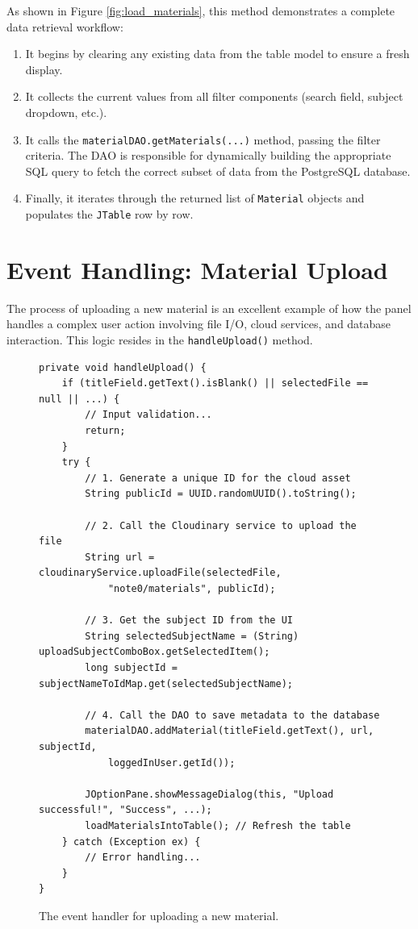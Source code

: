\documentclass[12pt, a4paper]{report}
\begin{document}
As shown in Figure \ref{fig:load_materials}, this method demonstrates a complete data retrieval workflow:
\begin{enumerate}
    \item It begins by clearing any existing data from the table model to ensure a fresh display.
    \item It collects the current values from all filter components (search field, subject dropdown, etc.).
    \item It calls the \texttt{materialDAO.getMaterials(...)} method, passing the filter criteria. The DAO is responsible for dynamically building the appropriate SQL query to fetch the correct subset of data from the PostgreSQL database.
    \item Finally, it iterates through the returned list of \texttt{Material} objects and populates the \texttt{JTable} row by row.
\end{enumerate}

\section{Event Handling: Material Upload}
The process of uploading a new material is an excellent example of how the panel handles a complex user action involving file I/O, cloud services, and database interaction. This logic resides in the \texttt{handleUpload()} method.

\begin{figure}[h!]
\begin{verbatim}
private void handleUpload() {
    if (titleField.getText().isBlank() || selectedFile == null || ...) {
        // Input validation...
        return;
    }
    try {
        // 1. Generate a unique ID for the cloud asset
        String publicId = UUID.randomUUID().toString();

        // 2. Call the Cloudinary service to upload the file
        String url = cloudinaryService.uploadFile(selectedFile, 
            "note0/materials", publicId);
        
        // 3. Get the subject ID from the UI
        String selectedSubjectName = (String) uploadSubjectComboBox.getSelectedItem();
        long subjectId = subjectNameToIdMap.get(selectedSubjectName);
        
        // 4. Call the DAO to save metadata to the database
        materialDAO.addMaterial(titleField.getText(), url, subjectId, 
            loggedInUser.getId());
        
        JOptionPane.showMessageDialog(this, "Upload successful!", "Success", ...);
        loadMaterialsIntoTable(); // Refresh the table
    } catch (Exception ex) {
        // Error handling...
    }
}
\end{verbatim}
\caption{The event handler for uploading a new material.}
\label{fig:handle_upload}
\end{figure}
\end{document}
